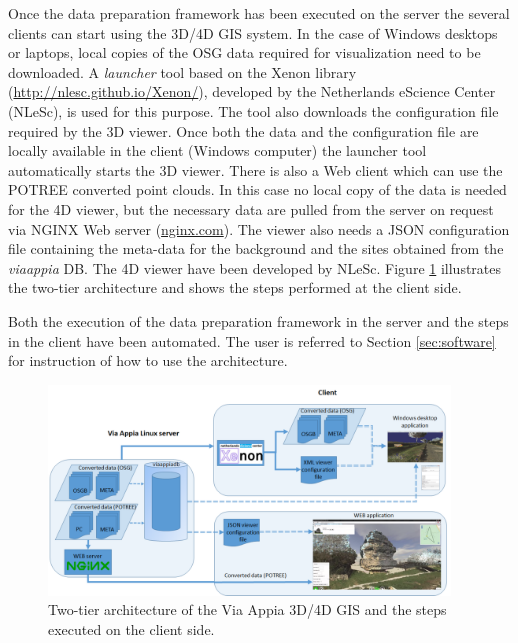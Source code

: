 Once the data preparation framework has been executed on the server the several clients can start using the 3D/4D GIS system. In the case of Windows desktops or laptops, local copies of the OSG  data required for visualization need to be downloaded. A \textit{launcher} tool based on the Xenon library (\url{http://nlesc.github.io/Xenon/}), developed by the Netherlands eScience Center (NLeSc), is used for this purpose. The tool also downloads the configuration file required by the 3D viewer. Once both the data and the configuration file are locally available in the client (Windows computer) the launcher tool automatically starts the 3D viewer. There is also a Web client which can use the POTREE converted point clouds. In this case no local copy of the data is needed for the 4D viewer, but the necessary data are pulled from the server on request via NGINX Web server (\url{nginx.com}). The viewer also needs a JSON configuration file containing the meta-data for the background and the sites obtained from the {\em viaappia} DB. The 4D viewer have been developed by NLeSc. Figure \ref{fig:sys_arch_2tier} illustrates the two-tier architecture and shows the steps performed at the client side. 

Both the execution of the data preparation framework in the server and the steps in the client have been automated. The user is referred to Section \ref{sec:software} for instruction of how to use the architecture.

\begin{figure}[H]
 \centering
 \includegraphics[width=0.95\textwidth]{fig/system_architecture/TwoTierArchitecture.pdf}
 \caption{Two-tier architecture of the Via Appia 3D/4D GIS and the steps executed on the client side.}
 \label{fig:sys_arch_2tier}
\end{figure}